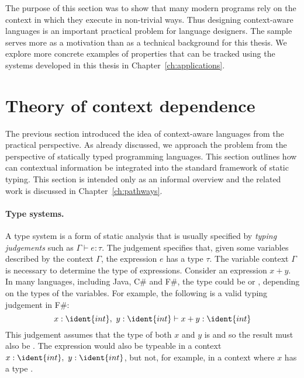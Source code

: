 The purpose of this section was to show that many modern programs rely on the context in which 
they execute in non-trivial ways. Thus designing context-aware languages is an important 
practical problem for language designers. The sample serves more as a motivation than as a 
technical background for this thesis. We explore more concrete examples of properties that 
can be tracked using the systems developed in this thesis in Chapter~\ref{ch:applications}. 


\section{Theory of context dependence}
\label{sec:intro-theory}

The previous section introduced the idea of context-aware languages from the practical perspective.
As already discussed, we approach the problem from the perspective of statically typed programming
languages. This section outlines how can contextual information be integrated into the 
standard framework of static typing. This section is intended only as an informal overview and the
related work is discussed in Chapter~\ref{ch:pathways}.

\paragraph{Type systems.}
A type system is a form of static analysis that is usually specified by \emph{typing judgements}
such as $\Gamma \vdash e : \tau$. The judgement specifies that, given some variables described by
the context $\Gamma$, the expression $e$ has a type $\tau$. 
The variable context $\Gamma$ is necessary to determine the type of expressions. Consider an 
expression $x + y$. In many languages, including Java, C\# and F\#, the type could be 
or , depending on the types of the variables. For example, the following is a valid
typing judgement in F\#:
%
\begin{equation*}
x\-:\-\ident{int},~y\-:\-\ident{int} \vdash x+y : \ident{int}
\end{equation*}
%
This judgement assumes that the type of both $x$ and $y$ is  and so the result must also
be . The expression would also be typeable in a context $x\-:\-\ident{int},~y\-:\-\ident{int}$,
but not, for example, in a context where $x$ has a type .


